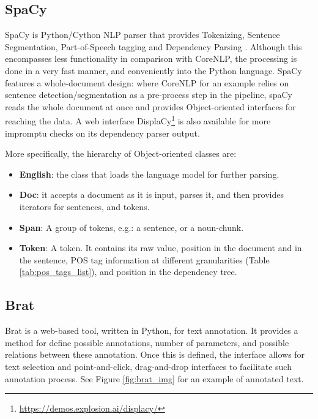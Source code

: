 \documentclass[11pt,a4paper,openright]{memoir}
\begin{document}
\subsection{SpaCy}

SpaCy \cite{spacy} is Python/Cython NLP parser that provides Tokenizing, Sentence Segmentation, Part-of-Speech tagging and Dependency Parsing \cite{honnibal-johnson:2015:EMNLP}. Although this encompasses less functionality in comparison with CoreNLP, the processing is done in a very fast manner, and conveniently into the Python language. SpaCy features a whole-document design: where CoreNLP for an example relies on sentence detection/segmentation as a pre-process step in the pipeline, spaCy reads the whole document at once and provides Object-oriented interfaces for reaching the data. A web interface DisplaCy\footnote{\url{https://demos.explosion.ai/displacy/}} is also available for more impromptu checks on its dependency parser output.

More specifically, the hierarchy of Object-oriented classes are:
\begin{itemize}
	\item \textbf{English}: the class that loads the language model for further parsing.
	\item \textbf{Doc}: it accepts a document as it is input, parses it, and then provides iterators for sentences, and tokens.
	\item \textbf{Span}: A group of tokens, e.g.: a sentence, or a noun-chunk.
	\item \textbf{Token}: A token. It contains its raw value, position in the document and in the sentence, POS tag information at different granularities (Table \ref{tab:pos_tags_list}), and position in the dependency tree.
\end{itemize}


\subsection{Brat}

Brat \cite{Stenetorp:2012:BWT:2380921.2380942} is a web-based tool, written in Python, for text annotation. It provides a method for define possible annotations, number of parameters, and possible relations between these annotation. Once this is defined, the interface allows for text selection and point-and-click, drag-and-drop interfaces to facilitate such annotation process. See Figure \ref{fig:brat_img} for an example of annotated text.
\end{document}
